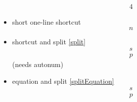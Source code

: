 \documentclass{article}
\def\ifautonum#1{#1}%
\def\ifautonum#1{}%
\begin{document}
\begin{itemize}
\begin{alignat}{4}
			\end{alignat}
		\item short one-line shortcut \[n\]
		\ifautonum{
			\item align, numbering always \begin{align+} a=l \end{align+} (needs autonum)
			\item gather, numbering always \begin{gather+} g=a \end{gather+} (needs autonum)
			\item multline, numbering always (and avoiding overfull hbox warning) \begin{multline+} m=u\line(1,0){220}=v \end{multline+} (needs autonum)
			\item equation, numbering always \begin{equation+} e=q \end{equation+} (needs autonum)
		}
		\item shortcut and split \ref{split} \[ \label{split}\begin{split} s \\ p \end{split} \] (needs autonum)
		\item equation and split \ref{splitEquation} \begin{equation} \label{splitEquation}\begin{split} s \\ p \end{split} \end{equation}
	\end{itemize}
\end{document}
